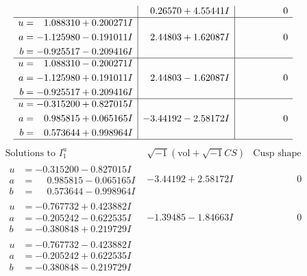 \documentclass[1p]{elsarticle_modified}
\theoremstyle{definition}
\newcommand{\I}{\sqrt{-1}}
\begin{document}
$$\begin{array}{c|c|c}
 & \phantom{-}0.26570 + 4.55441 I & \phantom{-0.000000 } 0 \\ \hline\begin{aligned}
u &= \phantom{-}1.088310 + 0.200271 I \\
a &= -1.125980 - 0.191011 I \\
b &= -0.925517 - 0.209416 I\end{aligned}
 & \phantom{-}2.44803 + 1.62087 I & \phantom{-0.000000 } 0 \\ \hline\begin{aligned}
u &= \phantom{-}1.088310 - 0.200271 I \\
a &= -1.125980 + 0.191011 I \\
b &= -0.925517 + 0.209416 I\end{aligned}
 & \phantom{-}2.44803 - 1.62087 I & \phantom{-0.000000 } 0 \\ \hline\begin{aligned}
u &= -0.315200 + 0.827015 I \\
a &= \phantom{-}0.985815 + 0.065165 I \\
b &= \phantom{-}0.573644 + 0.998964 I\end{aligned}
 & -3.44192 - 2.58172 I & \phantom{-0.000000 } 0\\
 \hline 
 \end{array}$$\newpage$$\begin{array}{c|c|c}  
\text{Solutions to }I^u_{1}& \I (\text{vol} + \sqrt{-1}CS) & \text{Cusp shape}\\
 \hline 
\begin{aligned}
u &= -0.315200 - 0.827015 I \\
a &= \phantom{-}0.985815 - 0.065165 I \\
b &= \phantom{-}0.573644 - 0.998964 I\end{aligned}
 & -3.44192 + 2.58172 I & \phantom{-0.000000 } 0 \\ \hline\begin{aligned}
u &= -0.767732 + 0.423882 I \\
a &= -0.205242 - 0.622535 I \\
b &= -0.380848 + 0.219729 I\end{aligned}
 & -1.39485 - 1.84663 I & \phantom{-0.000000 } 0 \\ \hline\begin{aligned}
u &= -0.767732 - 0.423882 I \\
a &= -0.205242 + 0.622535 I \\
b &= -0.380848 - 0.219729 I\end{aligned}

\end{array}$$
\end{document}
